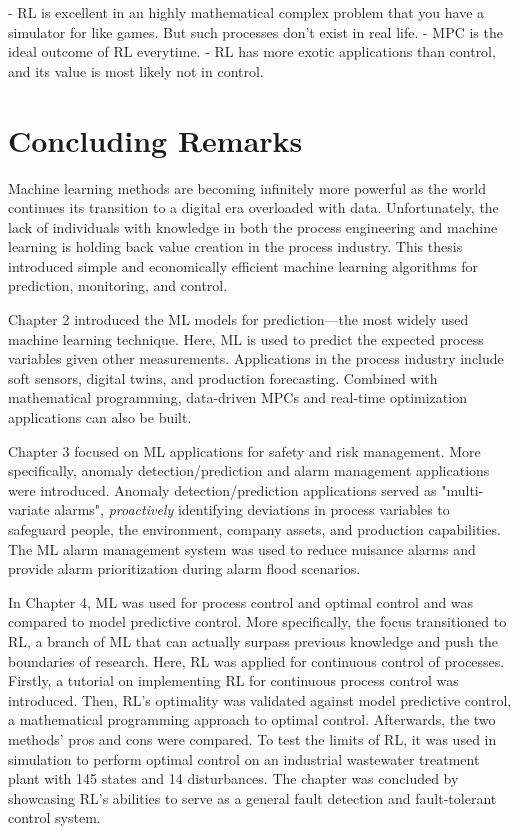 - RL is excellent in an highly mathematical complex problem that you have a simulator for like games.  But such processes don't exist in real life.
- MPC is the ideal outcome of RL everytime.
- RL has more exotic applications than control, and its value is most likely not in control.

\section{Concluding Remarks}
Machine learning methods are becoming infinitely more powerful as the world continues its transition to a digital era overloaded with data.  Unfortunately, the lack of individuals with knowledge in both the process engineering and machine learning is holding back value creation in the process industry.  This thesis introduced simple and economically efficient machine learning algorithms for prediction, monitoring, and control.

Chapter 2 introduced the ML models for prediction---the most widely used machine learning technique.  Here, ML is used to predict the expected process variables given other measurements.  Applications in the process industry include soft sensors, digital twins, and production forecasting.  Combined with mathematical programming, data-driven MPCs and real-time optimization applications can also be built.

Chapter 3 focused on ML applications for safety and risk management.  More specifically, anomaly detection/prediction and alarm management applications were introduced.  Anomaly detection/prediction applications served as "multi-variate alarms", \textit{proactively} identifying deviations in process variables to safeguard people, the environment, company assets, and production capabilities.  The ML alarm management system was used to reduce nuisance alarms and provide alarm prioritization during alarm flood scenarios.

In Chapter 4, ML was used for process control and optimal control and was compared to model predictive control. More specifically, the focus transitioned to RL, a branch of ML that can actually surpass previous knowledge and push the boundaries of research. Here, RL was applied for continuous control of processes. Firstly, a tutorial on implementing RL for continuous process control was introduced.  Then, RL's optimality was validated against model predictive control, a mathematical programming approach to optimal control. Afterwards, the two methods' pros and cons were compared.  To test the limits of RL, it was used in simulation to perform optimal control on an industrial wastewater treatment plant with 145 states and 14 disturbances.  The chapter was concluded by showcasing RL's abilities to serve as a general fault detection and fault-tolerant control system.  

